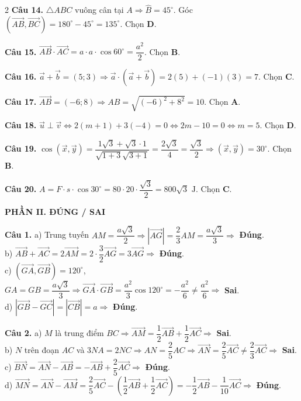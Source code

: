 \documentclass[10pt,a4paper]{article}
\begin{document}
\begin{multicols}{2}
\textbf{Câu 14.} $\triangle ABC$ vuông cân tại $A \Rightarrow \widehat{B} = 45^\circ$. Góc $(\vec{AB}, \vec{BC}) = 180^\circ - 45^\circ = 135^\circ$. Chọn \textbf{D}.

\textbf{Câu 15.} $\vec{AB} \cdot \vec{AC} = a \cdot a \cdot \cos 60^\circ = \dfrac{a^2}{2}$. Chọn \textbf{B}.

\textbf{Câu 16.} $\vec{a} + \vec{b} = (5; 3) \Rightarrow \vec{a} \cdot (\vec{a} + \vec{b}) = 2(5) + (-1)(3) = 7$. Chọn \textbf{C}.

\textbf{Câu 17.} $\vec{AB} = (-6; 8) \Rightarrow AB = \sqrt{(-6)^2 + 8^2} = 10$. Chọn \textbf{A}.

\textbf{Câu 18.} $\vec{u} \perp \vec{v} \Leftrightarrow 2(m + 1) + 3(-4) = 0 \Leftrightarrow 2m - 10 = 0 \Leftrightarrow m = 5$. Chọn \textbf{D}.

\textbf{Câu 19.} $\cos(\vec{x}, \vec{y}) = \dfrac{1\sqrt{3} + \sqrt{3}\cdot 1}{\sqrt{1+3}\sqrt{3+1}} = \dfrac{2\sqrt{3}}{4} = \dfrac{\sqrt{3}}{2} \Rightarrow (\vec{x}, \vec{y}) = 30^\circ$. Chọn \textbf{B}.

\textbf{Câu 20.} $A = F \cdot s \cdot \cos 30^\circ = 80 \cdot 20 \cdot \dfrac{\sqrt{3}}{2} = 800\sqrt{3}\text{ J}$. Chọn \textbf{C}.

\columnbreak

\textbf{\color{accent}PHẦN II. ĐÚNG / SAI}

\textbf{Câu 1.}
a) Trung tuyến $AM = \dfrac{a\sqrt{3}}{2} \Rightarrow |\vec{AG}| = \dfrac{2}{3}AM = \dfrac{a\sqrt{3}}{3} \Rightarrow$ \textbf{Đúng}.\\
b) $\vec{AB} + \vec{AC} = 2\vec{AM} = 2 \cdot \dfrac{3}{2}\vec{AG} = 3\vec{AG} \Rightarrow$ \textbf{Đúng}.\\
c) $(\vec{GA}, \vec{GB}) = 120^\circ$, $GA = GB = \dfrac{a\sqrt{3}}{3} \Rightarrow \vec{GA}\cdot\vec{GB} = \dfrac{a^2}{3}\cos 120^\circ = -\dfrac{a^2}{6} \ne \dfrac{a^2}{6} \Rightarrow$ \textbf{Sai}.\\
d) $|\vec{GB} - \vec{GC}| = |\vec{CB}| = a \Rightarrow$ \textbf{Đúng}.

\textbf{Câu 2.}
a) $M$ là trung điểm $BC \Rightarrow \vec{AM} = \dfrac{1}{2}\vec{AB} + \dfrac{1}{2}\vec{AC} \Rightarrow$ \textbf{Sai}.\\
b) $N$ trên đoạn $AC$ và $3NA = 2NC \Rightarrow AN = \dfrac{2}{5}AC \Rightarrow \vec{AN} = \dfrac{2}{5}\vec{AC} \ne \dfrac{2}{3}\vec{AC} \Rightarrow$ \textbf{Sai}.\\
c) $\vec{BN} = \vec{AN} - \vec{AB} = -\vec{AB} + \dfrac{2}{5}\vec{AC} \Rightarrow$ \textbf{Đúng}.\\
d) $\vec{MN} = \vec{AN} - \vec{AM} = \dfrac{2}{5}\vec{AC} - \left(\dfrac{1}{2}\vec{AB} + \dfrac{1}{2}\vec{AC}\right) = -\dfrac{1}{2}\vec{AB} - \dfrac{1}{10}\vec{AC} \Rightarrow$ \textbf{Đúng}.


\end{multicols}
\end{document}
